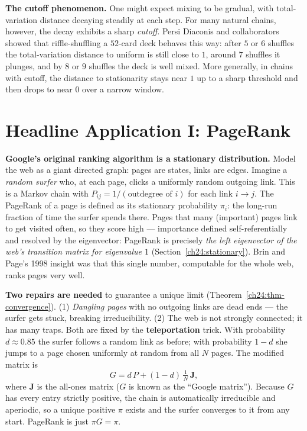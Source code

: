 \begin{paradoxbox}
\textbf{The cutoff phenomenon.} One might expect mixing to be gradual, with total-variation
distance decaying steadily at each step. For many natural chains, however, the
decay exhibits a sharp \emph{cutoff}. Persi Diaconis and collaborators showed that
riffle-shuffling a $52$-card deck behaves this way: after $5$ or $6$ shuffles the
total-variation distance to uniform is still close to $1$, around $7$ shuffles it plunges,
and by $8$ or $9$ shuffles the deck is well mixed. More generally, in chains with cutoff,
the distance to stationarity stays near $1$ up to a sharp threshold and then drops to near
$0$ over a narrow window.
\end{paradoxbox}

\section{Headline Application I: PageRank}
\label{ch24:pagerank}

\begin{applicationbox}
\textbf{Google's original ranking algorithm is a stationary distribution.} Model
the web as a giant directed graph: pages are states, links are edges. Imagine a
\emph{random surfer} who, at each page, clicks a uniformly random outgoing link.
This is a Markov chain with $P_{ij} = 1/(\text{outdegree of }i)$ for each link
$i\to j$. The PageRank of a page is defined as its stationary probability $\pi_i$:
the long-run fraction of time the surfer spends there. Pages that many
(important) pages link to get visited often, so they score high --- importance
defined self-referentially and resolved by the eigenvector: PageRank is
precisely \emph{the left eigenvector of the web's transition matrix for eigenvalue $1$}
(Section~\ref{ch24:stationary}). Brin and Page's 1998 insight was that this single
number, computable for the whole web, ranks pages very well.

\textbf{Two repairs are needed} to guarantee a unique limit
(Theorem~\ref{ch24:thm-convergence}). (1) \emph{Dangling pages} with no outgoing
links are dead ends --- the surfer gets stuck, breaking irreducibility. (2) The
web is not strongly connected; it has many traps. Both are fixed by the
\textbf{teleportation} trick. With probability $d \approx 0.85$ the surfer
follows a random link as before; with probability $1-d$ she jumps to a page chosen
uniformly at random from all $N$ pages. The modified matrix is
\[
  G = d\,P + (1-d)\,\tfrac{1}{N}\,\mathbf{J},
\]
where $\mathbf{J}$ is the all-ones matrix ($G$ is known as the ``Google matrix''). Because $G$ has
every entry strictly positive, the chain is automatically irreducible and
aperiodic, so a unique positive $\pi$ exists and the surfer converges to it from
any start. PageRank is just $\pi G = \pi$.
\end{applicationbox}

